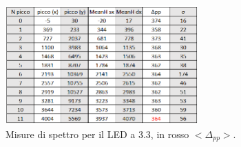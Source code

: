 \documentclass[11pt]{article} %
\begin{document}
\begin{figure}[h!]
\begin{center}
\includegraphics[width=280px]{img/tab33.png}
\caption{Misure di spettro per il LED a 3.3, in rosso $<\!\!\Delta_{pp}\!\!>$.}
\label{fig:Sipm33}
\end{center}
\end{figure}
\end{document}
